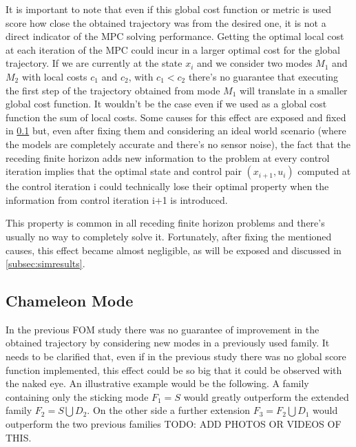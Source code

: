 \documentclass[12,twoside]{TFG-GM}
\theoremstyle{definition}
\theoremstyle{remark}
\begin{document}
It is important to note that even if this global cost function or metric is used score how close the obtained trajectory was from the desired one, it is not a direct indicator of the MPC solving performance. Getting the optimal local cost at each iteration of the MPC could incur in a larger optimal cost for the global trajectory. If we are currently at the state $x_i$ and we consider two modes $M_1$ and $M_2$ with local costs $c_1$ and $c_2$, with $c_1 < c_2$ there's no guarantee that executing the first step of the trajectory obtained from mode $M_1$ will translate in a smaller global cost function. It wouldn't be the case even if we used as a global cost function the sum of local costs. Some causes for this effect are exposed and fixed in \ref{subsec:chameleon} but, even after fixing them and considering an ideal world scenario (where the models are completely accurate and there's no sensor noise), the fact that the receding finite horizon adds new information to the problem at every control iteration implies that the optimal state and control pair $(x_{i+1}, u_{i})$ computed at the control iteration i could technically lose their optimal property when the information from control iteration i+1 is introduced.

This property is common in all receding finite horizon problems and there's usually no way to completely solve it. Fortunately, after fixing the mentioned causes, this effect became almost negligible, as will be exposed and discussed in \ref{subsec:simresults}.

\subsection{Chameleon Mode}
\label{subsec:chameleon}

In the previous FOM study there was no guarantee of improvement in the obtained trajectory by considering new modes in a previously used family. It needs to be clarified that, even if in the previous study there was no global score function implemented, this effect could be so big that it could be observed with the naked eye. An illustrative example would be the following. A family containing only the sticking mode $F_1 = S$ would greatly outperform the extended family $F_2 = S \bigcup D_2$. On the other side a further extension $F_3 = F_2 \bigcup D_1$ would outperform the two previous families TODO: ADD PHOTOS OR VIDEOS OF THIS.
\end{document}
